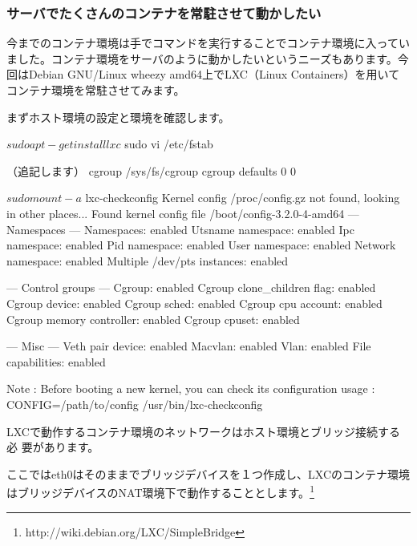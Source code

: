 \documentclass[mingoth,a4paper]{jsarticle}
\begin{document}
\subsubsection{サーバでたくさんのコンテナを常駐させて動かしたい}

今までのコンテナ環境は手でコマンドを実行することでコンテナ環境に入っていました。コンテナ環境をサーバのように動かしたいというニーズもあります。今回はDebian GNU/Linux wheezy amd64上でLXC（Linux Containers）を用いてコンテナ環境を常駐させてみます。

まずホスト環境の設定と環境を確認します。

\begin{commandline}
$ sudo apt-get install lxc
$ sudo vi /etc/fstab

（追記します）
cgroup  /sys/fs/cgroup  cgroup  defaults  0   0

$ sudo mount -a
$ lxc-checkconfig
Kernel config /proc/config.gz not found, looking in other places...
Found kernel config file /boot/config-3.2.0-4-amd64
--- Namespaces ---
Namespaces: enabled
Utsname namespace: enabled
Ipc namespace: enabled
Pid namespace: enabled
User namespace: enabled
Network namespace: enabled
Multiple /dev/pts instances: enabled

--- Control groups ---
Cgroup: enabled
Cgroup clone_children flag: enabled
Cgroup device: enabled
Cgroup sched: enabled
Cgroup cpu account: enabled
Cgroup memory controller: enabled
Cgroup cpuset: enabled

--- Misc ---
Veth pair device: enabled
Macvlan: enabled
Vlan: enabled
File capabilities: enabled

Note : Before booting a new kernel, you can check its configuration
usage : CONFIG=/path/to/config /usr/bin/lxc-checkconfig
\end{commandline}

LXCで動作するコンテナ環境のネットワークはホスト環境とブリッジ接続する必
要があります。

ここではeth0はそのままでブリッジデバイスを１つ作成し、LXCのコンテナ環境はブリッジデバイスのNAT環境下で動作することとします。\footnote{http://wiki.debian.org/LXC/SimpleBridge}
\end{document}
